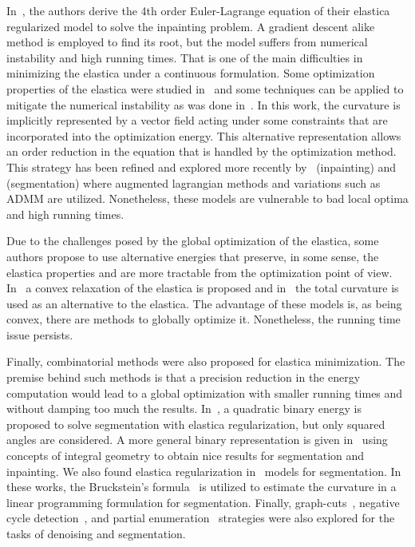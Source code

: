 \documentclass[smallextended]{svjour3}
\begin{document}
In~\cite{chan02elasticainpainting}, the authors derive the 4th
order Euler-Lagrange equation of their elastica regularized model to solve the 
inpainting problem. A gradient descent alike method is employed to find its root, 
but the model suffers from numerical instability and high running times. That is 
one of the main difficulties in minimizing the elastica under a continuous 
formulation. Some optimization properties of the elastica were studied 
in~\cite{ambrosio2003direct} and some techniques can be applied to mitigate 
the numerical instability as was done in~\cite{ballester01filljoint}. In this
work, the curvature is implicitly represented by a vector field acting under 
some constraints that are incorporated into the optimization energy. This alternative 
representation allows an order reduction in the equation that is handled by the 
optimization method. This strategy has been refined and explored 
more recently by~\cite{tai11elastica} (inpainting) and~\cite{zhu2013image,duan2014two}
(segmentation) where augmented lagrangian methods and variations such as ADMM
are utilized. Nonetheless, these models are vulnerable to bad local optima and
high running times. 


Due to the challenges posed by the global optimization of the elastica, some
authors propose to use alternative energies that preserve, in some sense, 
the elastica properties and are more tractable from the optimization point of
view. In~\cite{bredies15convex} a convex relaxation of the elastica is proposed 
and in~\cite{goldluecke11totalcurvature,zhong2020minimizing} the total curvature is
used as an alternative to the elastica. The advantage of these models is, as 
being convex, there are methods to globally optimize it. Nonetheless, the running 
time issue persists.


Finally, combinatorial methods were also proposed for elastica minimization. The
premise behind such methods is that a precision reduction in the energy
computation would lead to a global optimization with smaller running times and
without damping too much the results. In~\cite{zehiry10fast}, a quadratic binary
energy is proposed to solve segmentation with elastica regularization, but only 
squared angles are considered. A more general binary representation is given 
in~\cite{nieuwenhuis14efficient} using concepts of integral geometry to obtain
nice results for segmentation and inpainting. We also found elastica 
regularization in~\cite{schoenemann09linear,strandmark11globalframework} models 
for segmentation. In these works, the Bruckstein's 
formula~\cite{bruckstein01convergence} is utilized to estimate the curvature 
in a linear programming formulation for segmentation. Finally, 
graph-cuts~\cite{bae2010graph}, negative cycle 
detection~\cite{schoenemann2011elastic}, and partial 
enumeration~\cite{olsson2013partial,antunes20} strategies were also explored 
for the tasks of denoising and segmentation.
\end{document}
